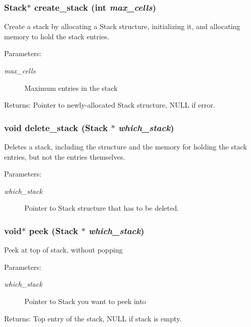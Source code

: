 \subsubsection{\setlength{\rightskip}{0pt plus 5cm}\bf{Stack}$\ast$ create\_\-stack (int {\em max\_\-cells})}\label{stack_8h_f3af8ef3ef58b09c15cca16fd5e09907}


Create a stack by allocating a Stack structure, initializing it, and allocating memory to hold the stack entries. \begin{Desc}
\item[Parameters:]
\begin{description}
\item[{\em max\_\-cells}]Maximum entries in the stack \end{description}
\end{Desc}
\begin{Desc}
\item[Returns:]Pointer to newly-allocated Stack structure, NULL if error. \end{Desc}
\subsubsection{\setlength{\rightskip}{0pt plus 5cm}void delete\_\-stack (\bf{Stack} $\ast$ {\em which\_\-stack})}\label{stack_8h_f3285173a95add78b1910a3267378ed6}


Deletes a stack, including the structure and the memory for holding the stack entries, but not the entries themselves. \begin{Desc}
\item[Parameters:]
\begin{description}
\item[{\em which\_\-stack}]Pointer to Stack structure that has to be deleted. \end{description}
\end{Desc}
\subsubsection{\setlength{\rightskip}{0pt plus 5cm}void$\ast$ peek (\bf{Stack} $\ast$ {\em which\_\-stack})}\label{stack_8h_e6d178d94e76c529952cc01831026670}


Peek at top of stack, without popping \begin{Desc}
\item[Parameters:]
\begin{description}
\item[{\em which\_\-stack}]Pointer to Stack you want to peek into \end{description}
\end{Desc}
\begin{Desc}
\item[Returns:]Top entry of the stack, NULL if stack is empty. \end{Desc}
